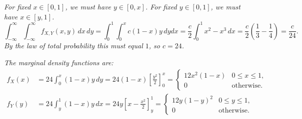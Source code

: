 \begin{solution}
\ben

\it %
\bit
\it For fixed $x\in[0,1]$, we must have $y\in[0,x]$.
\it For fixed $y\in[0,1]$, we must have $x\in[y,1]$.
\eit
\[
\int_{-\infty}^{\infty}\int_{-\infty}^{\infty}f_{X,Y}(x,y)\,dx\,dy
	= \int_0^1\int_0^x c(1-x)y\,dydx 
	= \frac{c}{2}\int_0^1 x^2-x^3\,dx
	= \frac{c}{2}\left(\frac{1}{3}-\frac{1}{4}\right)
	= \frac{c}{24}.
\]
By the law of total probability this must equal $1$, so $c=24$.

\it %
The marginal density functions are:
\begin{align*}
f_X(x) 	
	& = 24\int_0^x (1-x)y\,dy 
	= 24(1-x)\left[\frac{y^2}{2}\right]_0^x
	= \begin{cases}
		12x^2(1-x) & 0\leq x\leq 1, \\
		0			& \text{otherwise.}
		\end{cases} \\
f_Y(y) 	
	& = 24\int_y^1 (1-x)y\,dx 
	= 24y\left[x - \frac{x^2}{2}\right]_y^1
	= \begin{cases}
		12y(1-y)^2 & 0\leq y\leq 1, \\
		0			& \text{otherwise.}
		\end{cases}
\end{align*}

\een
\end{solution}


